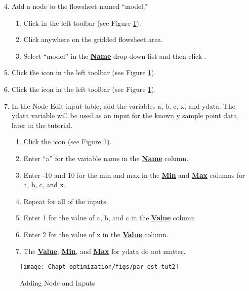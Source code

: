 \begin{enumerate}
	\setcounter{enumi}{3}
	\item Add a node to the flowsheet named ``model.''
	\begin{enumerate}
		\item Click  in the left toolbar (see Figure \ref{fig.pe.tut2}).
		\item Click anywhere on the gridded flowsheet area.
		\item Select ``model'' in the \textbf{\underline{Name}} drop-down list and then click .
	\end{enumerate}
	\item Click the  icon in the left toolbar (see Figure \ref{fig.pe.tut2}).
	\item Click the  icon in the left toolbar (see Figure \ref{fig.pe.tut2}).
	\item In the Node Edit input table, add the variables a, b, c, x, and ydata. The ydata variable will be used as an input for the known y sample point data, later in the tutorial.
	\begin{enumerate}
		\item Click the  icon  (see Figure \ref{fig.pe.tut2}).
		\item Enter ``a'' for the variable name in the \textbf{\underline{Name}} column.
		\item Enter -10 and 10 for the min and max in the \textbf{\underline{Min}} and \textbf{\underline{Max}} columns for a, b, c, and x.
		\item Repeat for all of the inputs.
		\item Enter 1 for the value of a, b, and c in the \textbf{\underline{Value}} column.
		\item Enter 2 for the value of x in the \textbf{\underline{Value}} column.
		\item The \textbf{\underline{Value}}, \textbf{\underline{Min}}, and \textbf{\underline{Max}} for ydata do not matter.
	\end{enumerate}
\end{enumerate}



\begin{figure}[H]
	\begin{center}
		\texttt{[image: Chapt\_optimization/figs/par\_est\_tut2]}
		\caption{Adding Node and Inputs}
		\label{fig.pe.tut2}
	\end{center}
\end{figure}

